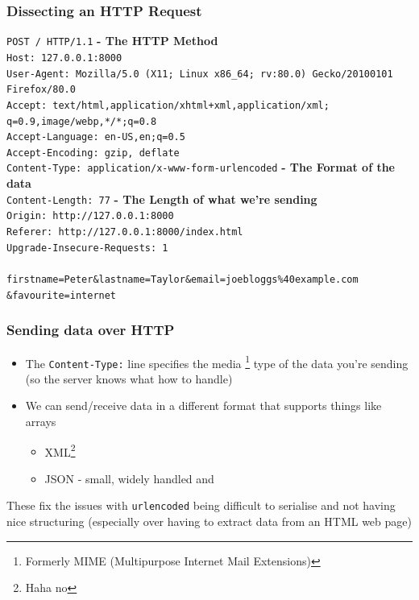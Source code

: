 \documentclass[aspectratio=169]{beamer}
\begin{document}
\begin{frame}
  \frametitle{Dissecting an HTTP Request}

\texttt{POST / HTTP/1.1} \textbf{- The HTTP Method} \pause\\
{\tiny
\texttt{Host: 127.0.0.1:8000}\\
\texttt{User-Agent: Mozilla/5.0 (X11; Linux x86\_64; rv:80.0) Gecko/20100101}\\\hspace{2em} \texttt{Firefox/80.0}\\
}
\texttt{Accept: text/html,application/xhtml+xml,application/xml;}\\\hspace{2em}\texttt{q=0.9,image/webp,*/*;q=0.8}\\
{\tiny
\texttt{Accept-Language: en-US,en;q=0.5}\\
\texttt{Accept-Encoding: gzip, deflate}\pause\\
}
\texttt{Content-Type: application/x-www-form-urlencoded} \textbf{- The Format of the data}\pause\\
\texttt{Content-Length: 77} \textbf{- The Length of what we're sending}\pause\\
{\tiny
\texttt{Origin: http://127.0.0.1:8000} \\
\texttt{Referer: http://127.0.0.1:8000/index.html}\\
\texttt{Upgrade-Insecure-Requests: 1}\\
}
\texttt{ }\\
\texttt{firstname=Peter\&lastname=Taylor\&email=joebloggs\%40example.com}\\
\hspace{2em}\texttt{\&favourite=internet}\\
  
\end{frame}

\begin{frame}
  \frametitle{Sending data over HTTP}
  \begin{itemize}
    \item The \texttt{Content-Type:} line specifies the media \footnote{Formerly MIME (Multipurpose Internet Mail Extensions)} type of the data you're sending (so the server knows what how to handle)
    \item We can send/receive data in a different format that supports things like arrays
    \begin{itemize}
      \item XML\footnote{Haha no}
      \item JSON - small, widely handled and 
    \end{itemize}
  \end{itemize}
  These fix the issues with \texttt{urlencoded} being difficult to serialise and not having nice structuring (especially over having to extract data from an HTML web page)
\end{frame}
\end{document}
